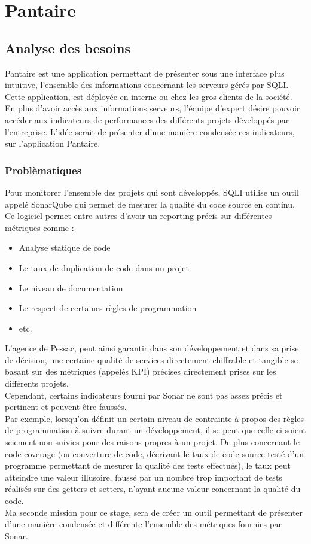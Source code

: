 \documentclass{report}
\newcommand{\jumpOne}{\\[1\baselineskip]}
\newcommand{\jumpTwo}{\\[2\baselineskip]}
\begin{document}
 
 
\chapter{Pantaire}

\section{Analyse des besoins}
Pantaire est une application permettant de présenter sous une interface plus intuitive, l'ensemble des informations concernant les serveurs gérés par SQLI. 
Cette application, est déployée en interne ou chez les gros clients de la société. 
\jumpOne
En plus d'avoir accès aux informations serveurs, l'équipe d'expert désire pouvoir accéder aux indicateurs de performances des différents projets développés par l'entreprise. L'idée serait de présenter d'une manière condensée ces indicateurs, sur l'application Pantaire. 

\subsection{Problèmatiques}
Pour monitorer l'ensemble des projets qui sont développés, SQLI utilise un outil appelé \gls{SonarQube} qui permet de mesurer la qualité du code source en continu. 
Ce logiciel permet entre autres d'avoir un reporting précis sur différentes métriques comme :
\begin{itemize}
    \item Analyse statique de code
	\item Le taux de duplication de code dans un projet
	\item Le niveau de documentation
	\item Le respect de certaines règles de programmation 
	\item etc. 
\end{itemize}
L'agence de Pessac, peut ainsi garantir dans son développement et dans sa prise de décision, une certaine qualité de services directement chiffrable et tangible se basant sur des métriques (appelés \gls{KPI}) précises directement prises sur les différents projets. 
\jumpTwo
Cependant, certains indicateurs fourni par Sonar ne sont pas assez précis et pertinent et peuvent être faussés.
\jumpOne
Par exemple, lorsqu'on définit un certain niveau de contrainte à propos des règles de programmation à suivre durant un développement, il se peut que celle-ci soient sciement non-suivies pour des raisons propres à un projet. 
De plus concernant le code coverage (ou couverture de code, décrivant le taux de code source testé d'un programme permettant de mesurer la qualité des tests effectués), le taux peut atteindre une valeur illusoire, faussé par un nombre trop important de tests réalisés sur des getters et setters, n'ayant aucune valeur concernant la qualité du code.
\jumpTwo
Ma seconde mission pour ce stage, sera de créer un outil permettant de présenter d'une manière condensée et différente l'ensemble des métriques fournies par Sonar. 
\end{document}
